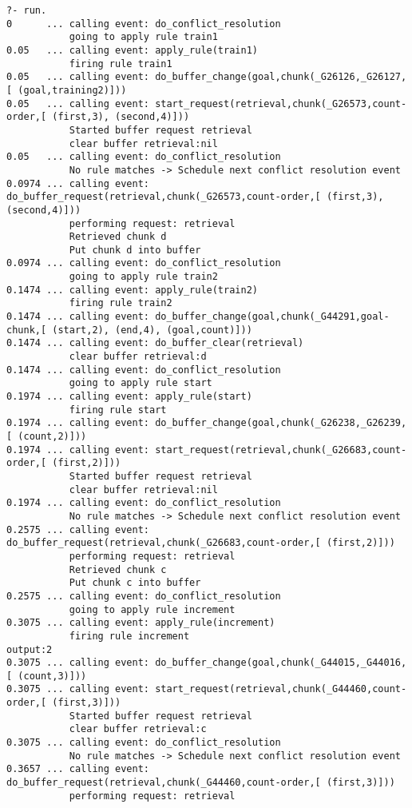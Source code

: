 \raggedbottom
\begin{lstlisting}
?- run.
0      ... calling event: do_conflict_resolution
           going to apply rule train1
0.05   ... calling event: apply_rule(train1)
           firing rule train1
0.05   ... calling event: do_buffer_change(goal,chunk(_G26126,_G26127,[ (goal,training2)]))
0.05   ... calling event: start_request(retrieval,chunk(_G26573,count-order,[ (first,3), (second,4)]))
           Started buffer request retrieval
           clear buffer retrieval:nil
0.05   ... calling event: do_conflict_resolution
           No rule matches -> Schedule next conflict resolution event
0.0974 ... calling event: do_buffer_request(retrieval,chunk(_G26573,count-order,[ (first,3), (second,4)]))
           performing request: retrieval
           Retrieved chunk d
           Put chunk d into buffer
0.0974 ... calling event: do_conflict_resolution
           going to apply rule train2
0.1474 ... calling event: apply_rule(train2)
           firing rule train2
0.1474 ... calling event: do_buffer_change(goal,chunk(_G44291,goal-chunk,[ (start,2), (end,4), (goal,count)]))
0.1474 ... calling event: do_buffer_clear(retrieval)
           clear buffer retrieval:d
0.1474 ... calling event: do_conflict_resolution
           going to apply rule start
0.1974 ... calling event: apply_rule(start)
           firing rule start
0.1974 ... calling event: do_buffer_change(goal,chunk(_G26238,_G26239,[ (count,2)]))
0.1974 ... calling event: start_request(retrieval,chunk(_G26683,count-order,[ (first,2)]))
           Started buffer request retrieval
           clear buffer retrieval:nil
0.1974 ... calling event: do_conflict_resolution
           No rule matches -> Schedule next conflict resolution event
0.2575 ... calling event: do_buffer_request(retrieval,chunk(_G26683,count-order,[ (first,2)]))
           performing request: retrieval
           Retrieved chunk c
           Put chunk c into buffer
0.2575 ... calling event: do_conflict_resolution
           going to apply rule increment
0.3075 ... calling event: apply_rule(increment)
           firing rule increment
output:2
0.3075 ... calling event: do_buffer_change(goal,chunk(_G44015,_G44016,[ (count,3)]))
0.3075 ... calling event: start_request(retrieval,chunk(_G44460,count-order,[ (first,3)]))
           Started buffer request retrieval
           clear buffer retrieval:c
0.3075 ... calling event: do_conflict_resolution
           No rule matches -> Schedule next conflict resolution event
0.3657 ... calling event: do_buffer_request(retrieval,chunk(_G44460,count-order,[ (first,3)]))
           performing request: retrieval

\end{lstlisting}
